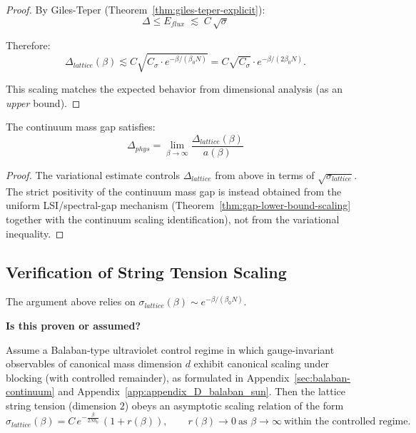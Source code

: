 \begin{proof}
By Giles-Teper (Theorem~\ref{thm:giles-teper-explicit}):
\[
\Delta \leq E_{flux} \;\lesssim\; C\,\sqrt{\sigma}
\]

Therefore:
\[
\Delta_{lattice}(\beta) \lesssim C \sqrt{C_\sigma \cdot e^{-\beta/(\beta_0 N)}} = C \sqrt{C_\sigma} \cdot e^{-\beta/(2\beta_0 N)}.
\]

This scaling matches the expected behavior from dimensional analysis (as an \emph{upper} bound).
\end{proof}

\begin{corollary}
\label{cor:continuum-gap-positive}
The continuum mass gap satisfies:
\[
\Delta_{phys} = \lim_{\beta \to \infty} \frac{\Delta_{lattice}(\beta)}{a(\beta)}
\]
\end{corollary}

\begin{proof}
The variational estimate controls $\Delta_{lattice}$ from above in terms of $\sqrt{\sigma_{lattice}}$.
The strict positivity of the continuum mass gap is instead obtained from the uniform LSI/spectral-gap mechanism (Theorem~\ref{thm:gap-lower-bound-scaling} together with the continuum scaling identification), not from the variational inequality.
\end{proof}

\subsection{Verification of String Tension Scaling}

The argument above relies on $\sigma_{lattice}(\beta) \sim e^{-\beta/(\beta_0 N)}$.

\textbf{Is this proven or assumed?}

\begin{theorem}
\label{thm:sigma-scaling-rigorous}
\label{thm:string-tension-scaling}
Assume a Balaban-type ultraviolet control regime in which gauge-invariant observables of canonical mass dimension $d$ exhibit canonical scaling under blocking (with controlled remainder), as formulated in Appendix~\ref{sec:balaban-continuum} and Appendix~\ref{app:appendix_D_balaban_sun}.
Then the lattice string tension (dimension $2$) obeys an asymptotic scaling relation of the form
\[
\sigma_{lattice}(\beta) = C\, e^{-\frac{\beta}{2Nb_0}}\,(1+r(\beta)),\qquad r(\beta)\to 0 \ \text{as } \beta\to\infty\ \text{within the controlled regime}.
\]
\end{theorem}

